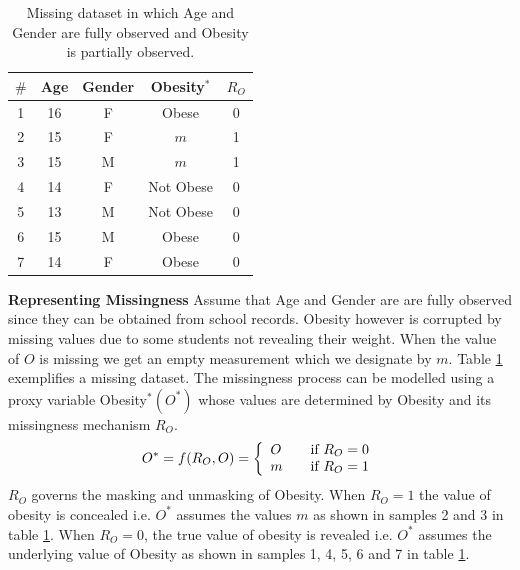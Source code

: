 \documentclass[12pt]{article}
\begin{document}
\begin{table}[h]
	\centering
	\caption{Missing dataset in which Age and Gender are fully observed and Obesity is partially observed.}
	\begin{tabular}{|c|c|c|c|c|}
		\hline
		$\#$ &Age & Gender & Obesity$^*$& $R_O$\\
		\hline
		1 & 16 & F & Obese&0\\
				2 & 15 & F & $m$ &1\\
				3 & 		15 & M & $m$&1\\
							4&	14 & F & Not Obese&0\\
								5&		13 & M & Not Obese&0\\
					6&	15 & M & Obese&0\\
						7&		14 & F & Obese&0\\
								\hline
	\end{tabular}
\label{tab:dataset}
\end{table}

\textbf{Representing Missingness} Assume that Age and Gender are are fully observed since they can be obtained from school records. Obesity however is corrupted by missing values due to some students not revealing their weight.  When the value of $O$ is missing we get an empty measurement which we designate by $m$. Table \ref{tab:dataset} exemplifies a missing dataset. The missingness process can be modelled using a proxy variable Obesity$^* (O^*)$ whose values are determined by Obesity and its missingness mechanism $R_O$.
\begin{equation}    
O^*=f (R_{O},O)  = \left\{
\begin{array}{l l} 
O & \quad \text{if }R_{O}=0\nonumber \\
m & \quad \text{if }R_{O}=1\\
\end{array} \right. 
\end{equation} 
$R_O$ governs the masking and unmasking of Obesity.   When $R_O=1$ the value of obesity is concealed i.e. $O^*$ assumes the values $m$ as shown in samples 2 and 3 in table \ref{tab:dataset}. When $R_O=0$, the true value of obesity is revealed i.e.  $O^*$ assumes the underlying value of Obesity as shown in samples 1, 4, 5, 6 and 7 in table \ref{tab:dataset}. 
\end{document}
